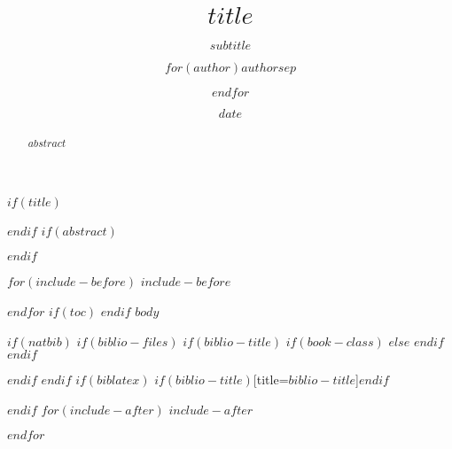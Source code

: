 \documentclass[b5paper,twoside,openright,final]{memoir}
\title{$title$}
\subtitle{$subtitle$}
\author{$for(author)$$author$$sep$ \and $endfor$}
\date{$date$}
\newlength\drop
\newcommand*{\titleGM}{%
\thispagestyle{empty}
\begingroup%
\drop = 0.1\textheight
\vspace*{\baselineskip}
\vfill
\hbox{%
  \hspace*{0.2\textwidth}%
  \rule{1pt}{\dimexpr\textheight-28pt\relax}%
  \hspace*{0.05\textwidth}%
  \parbox[b]{0.75\textwidth}{%
    \vbox{%
      \vspace{\drop}
      {\Huge\bfseries\raggedright\thetitle\par}\vskip2.37\baselineskip
      {\Large\bfseries\theauthor\par}
      \vspace{0.5\textheight}
      {\small\thedate\par}
      \vskip2\baselineskip
    }%
  }%
}%
\vfill
\null
\endgroup
\cleardoublepage}
\begin{document}
\frontmatter
$if(title)$
\begin{titlingpage}
\titleGM
\end{titlingpage}
$endif$
$if(abstract)$
\begin{abstract}
$abstract$
\end{abstract}
$endif$

$for(include-before)$
$include-before$

$endfor$
$if(toc)$
{
\hypersetup{linkcolor=black}
\setcounter{tocdepth}{$toc-depth$}
\tableofcontents
}
$endif$
\mainmatter
$body$

$if(natbib)$
$if(biblio-files)$
$if(biblio-title)$
$if(book-class)$
\renewcommand\bibname{$biblio-title$}
$else$
\renewcommand\refname{$biblio-title$}
$endif$
$endif$


$endif$
$endif$
$if(biblatex)$
\printbibliography$if(biblio-title)$[title=$biblio-title$]$endif$

$endif$
$for(include-after)$
$include-after$

$endfor$
\end{document}
